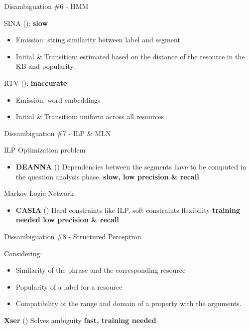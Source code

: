 \documentclass{beamer}
\begin{document}
\begin{frame}{Disambiguation \#6 - HMM}
  \begin{card}
    SINA (\cite{shekarpour2015a}): \textbf{slow}
    \begin{itemize}
      \item Emission: string similarity between label and segment.
      \item Initial \& Transition: estimated based on the distance of the resource in the KB and popularity.
    \end{itemize}
  \end{card}
  \begin{card}
    RTV (\cite{giannone2013a}): \textbf{inaccurate}
    \begin{itemize}
      \item Emission: word embeddings
      \item Initial \& Transition: uniform across all resources
    \end{itemize}
  \end{card}
\end{frame}

\begin{frame}{Dissambiguation \#7 - ILP \& MLN}
  \begin{card}
    ILP Optimization problem
    \begin{itemize}
      \item \textbf{DEANNA} (\cite{yahya2013a}) Dependencies between the segments have to be computed in the question analysis phase. \textbf{slow, low precision \& recall}
    \end{itemize}
  \end{card}
  \begin{card}
    Markov Logic Network
    \begin{itemize}
      \item \textbf{CASIA} (\cite{he2014a}) Hard constraints like ILP, soft constraints flexibility \textbf{training needed low precision \& recall}
    \end{itemize}
  \end{card}
\end{frame}

\begin{frame}{Dissambiguation \#8 - Structured Perceptron}
  \begin{card}
    Considering:
    \begin{itemize}
      \item Similarity of the phrase and the corresponding resource
      \item Popularity of a label for a resource
      \item Compatibility of the range and domain of a property with the arguments.
    \end{itemize}
    \textbf{Xser} (\cite{xu2014a}) Solves ambiguity \textbf{fast, training needed}
  \end{card}
\end{frame}
\end{document}
